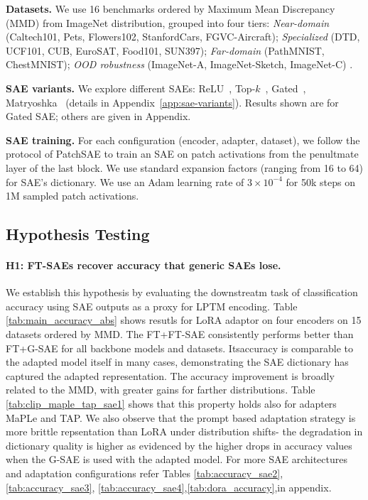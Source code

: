 \textbf{Datasets.}
We use 16 benchmarks ordered by Maximum Mean Discrepancy (MMD) from ImageNet distribution,
grouped into four tiers:
\emph{Near-domain} (Caltech101, Pets, Flowers102, StanfordCars, FGVC-Aircraft);
\emph{Specialized} (DTD, UCF101, CUB, EuroSAT, Food101, SUN397);
\emph{Far-domain} (PathMNIST, ChestMNIST);
\emph{OOD robustness} (ImageNet-A, ImageNet-Sketch, ImageNet-C)
\citep{fei2004caltech,parkhi2012cats,nilsback2008automated,krause2013collecting,
maji2013fine,cimpoi2013describing,soomro2012ucf101,helber2019eurosat,
bossard2014food,xiao2010sun,yang2023medmnist,irvin2019chexpert,
hendrycks2021natural,wang2019learning,hendrycks2019benchmarking}.

\noindent\textbf{SAE variants.}
We explore different SAEs: ReLU~\citep{cunningham2024sparse}, Top-$k$~\citep{gao2025scaling}, Gated~\citep{rajamanoharan2024improving}, Matryoshka~\citep{bussmann2025matryoshka,zaremba2025msae} (details in Appendix~\ref{app:sae-variants}). Results shown are for Gated SAE; others are given in Appendix.

\textbf{SAE training.}
For each configuration (encoder, adapter, dataset), we follow the protocol of PatchSAE to train an SAE on patch activations from the penultmate layer of the last block. We use standard expansion factors (ranging from 16 to 64) for SAE's dictionary. We use an Adam learning rate of $3{\times}10^{-4}$ for 50k steps on 1M sampled patch activations.

\vspace{-6pt}
\subsection{Hypothesis Testing}
\label{sec:exp:hypotheses}
\vspace{-5pt}

\paragraph{H1: FT-SAEs recover accuracy that generic SAEs lose.}\label{sec:exp:h1}
We establish this hypothesis by evaluating the downstreatm task of classification accuracy using SAE outputs as a proxy for LPTM encoding. Table \ref{tab:main_accuracy_abs} shows resutls for LoRA adaptor on four encoders on 15 datasets ordered by MMD. The FT+FT-SAE consistently performs better than FT+G-SAE for all backbone models and datasets. Itsaccuracy is comparable to the adapted model itself in many cases, demonstrating the SAE dictionary has captured the adapted representation. The accuracy improvement is broadly related to the MMD, with greater gains for farther distributions. Table \ref{tab:clip_maple_tap_sae1} shows that this property holds also for adapters MaPLe and TAP. We also observe that the prompt based adaptation strategy is more brittle repsentation than LoRA under distribution shifts- the degradation in dictionary quality is higher as evidenced by the higher drops in accuracy values when the G-SAE is used with the adapted model. For more SAE architectures and adaptation configurations refer Tables \ref{tab:accuracy_sae2}, \ref{tab:accuracy_sae3}, \ref{tab:accuracy_sae4},\ref{tab:dora_accuracy},in appendix.

